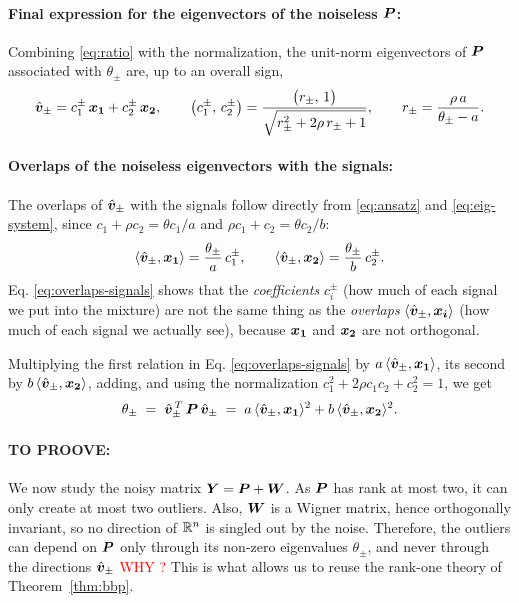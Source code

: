 \documentclass[11pt]{article}
\begin{document}
\paragraph{Final expression for the eigenvectors of the noiseless $\bm{P}$:} Combining \eqref{eq:ratio} with the normalization, the unit-norm eigenvectors of $\bm{P}$ associated with $\theta_\pm$ are, up to an overall sign,
\begin{equation}
    \hat{\bm{v}}_\pm = c_1^\pm\,\bm{x_1} + c_2^\pm\,\bm{x_2},
    \qquad
    \big(c_1^\pm,\, c_2^\pm\big) = \frac{\big(r_\pm,\, 1\big)}{\sqrt{r_\pm^2 + 2\rho\, r_\pm + 1}},
    \qquad
    r_\pm = \frac{\rho\, a}{\theta_\pm - a} .
    \label{eq:v-final}
\end{equation}

\paragraph{Overlaps of the noiseless eigenvectors with the signals:} The overlaps of $\hat{\bm{v}}_\pm$ with the signals follow directly from \eqref{eq:ansatz} and \eqref{eq:eig-system}, since $c_1 + \rho c_2 = \theta c_1/a$ and $\rho c_1 + c_2 = \theta c_2/b$:
\begin{equation}
    \langle \hat{\bm{v}}_\pm, \bm{x_1}\rangle = \frac{\theta_\pm}{a}\, c_1^\pm,
    \qquad
    \langle \hat{\bm{v}}_\pm, \bm{x_2}\rangle = \frac{\theta_\pm}{b}\, c_2^\pm .
    \label{eq:overlaps-signals}
\end{equation}
Eq. \eqref{eq:overlaps-signals} shows that the \emph{coefficients} $c_i^\pm$ (how much of each signal we put into the mixture) are not the same thing as the \emph{overlaps} $\langle \hat{\bm{v}}_\pm, \bm{x_i}\rangle$ (how much of each signal we actually see), because $\bm{x_1}$ and $\bm{x_2}$ are not orthogonal.

\medskip
\noindent
Multiplying the first relation in Eq. \eqref{eq:overlaps-signals} by $a\,\langle \hat{\bm{v}}_\pm, \bm{x_1}\rangle$, its second by $b\,\langle \hat{\bm{v}}_\pm, \bm{x_2}\rangle$, adding, and using the normalization $c_1^2 + 2\rho c_1 c_2 + c_2^2 = 1$, we get
\begin{equation}
    \theta_\pm \;=\; \hat{\bm{v}}_\pm^{\,T}\, \bm{P}\, \hat{\bm{v}}_\pm
    \;=\; a\,\langle \hat{\bm{v}}_\pm, \bm{x_1}\rangle^2 + b\,\langle \hat{\bm{v}}_\pm, \bm{x_2}\rangle^2 .
    \label{eq:theta-pm-relation}
\end{equation}

\paragraph{TO PROOVE:}
We now study the noisy matrix $\bm{Y} = \bm{P} + \bm{W}$. As $\bm{P}$ has rank at most two, it can only create at most two outliers. Also, $\bm{W}$ is a Wigner matrix, hence orthogonally invariant, so no direction of ${\mathbb R}^n$ is singled out by the noise. Therefore, the outliers can depend on $\bm{P}$ only through its non-zero eigenvalues $\theta_\pm$, and never through the directions $\hat{\bm{v}}_\pm$ \textcolor{red}{WHY ?} This is what allows us to reuse the rank-one theory of Theorem~\ref{thm:bbp}.
\end{document}
